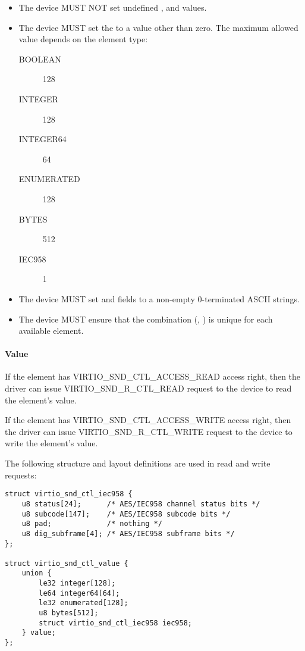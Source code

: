 \begin{itemize}
\item The device MUST NOT set undefined ,  and
 values.
\item The device MUST set the  to a value other than zero. The maximum
allowed value depends on the element type:
\begin{description}
\item[BOOLEAN] 128
\item[INTEGER] 128
\item[INTEGER64] 64
\item[ENUMERATED] 128
\item[BYTES] 512
\item[IEC958] 1
\end{description}
\item The device MUST set  and  fields to a non-empty
0-terminated ASCII strings.
\item The device MUST ensure that the combination (, )
is unique for each available element.
\end{itemize}

\paragraph{Value}

If the element has VIRTIO_SND_CTL_ACCESS_READ access right, then the driver
can issue VIRTIO_SND_R_CTL_READ request to the device to read the element's
value.

If the element has VIRTIO_SND_CTL_ACCESS_WRITE access right, then the driver
can issue VIRTIO_SND_R_CTL_WRITE request to the device to write the element's
value.

The following structure and layout definitions are used in read and write requests:

\begin{lstlisting}
struct virtio_snd_ctl_iec958 {
    u8 status[24];      /* AES/IEC958 channel status bits */
    u8 subcode[147];    /* AES/IEC958 subcode bits */
    u8 pad;             /* nothing */
    u8 dig_subframe[4]; /* AES/IEC958 subframe bits */
};

struct virtio_snd_ctl_value {
    union {
        le32 integer[128];
        le64 integer64[64];
        le32 enumerated[128];
        u8 bytes[512];
        struct virtio_snd_ctl_iec958 iec958;
    } value;
};
\end{lstlisting}

